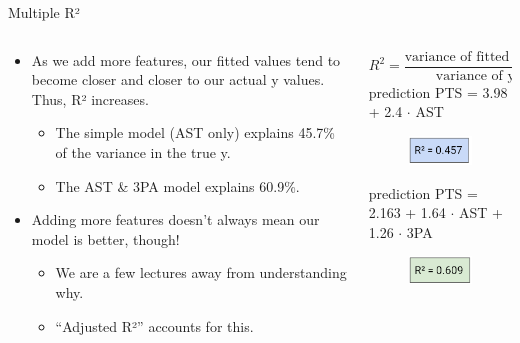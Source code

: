 \documentclass[aspectratio=169]{../latex_main/tntbeamer}  %
\begin{document}
	
	
	
	\begin{frame}{Multiple R²}
	    \begin{columns}
	        \begin{column}{.6\textwidth}
	                \begin{itemize}
	                    \item As we add more features, our fitted values tend to become closer and closer to our actual y values. Thus, R² increases.
	                    \begin{itemize}
	                        \item The simple model (AST only) explains 45.7\% of the variance in the true y.
	                        \item The AST \& 3PA model explains 60.9\%.
	                    \end{itemize}
	                    \item Adding more features doesn’t always mean our model is better, though!
	                    \begin{itemize}
	                        \item We are a few lectures away from understanding why.  
	                        \item “Adjusted R²” accounts for this.
	                    \end{itemize}
	                \end{itemize}
	        \end{column}
	            
	        \begin{column}{.4\textwidth}
	        \vspace{-1em}
	                \begin{equation*}
	                     R^2 = \frac{\text{variance of fitted values}}{\text{variance of y}}
	                 \end{equation*}
	            prediction PTS = 3.98 + 2.4 $\cdot$ AST
	            \begin{figure}
	                \includegraphics[scale=.4]{Bild14}
	            \end{figure}
	            
	            prediction PTS = 2.163 + 1.64 $\cdot$ AST + 1.26 $\cdot$ 3PA
	             \begin{figure}
	                \includegraphics[scale=.4]{Bild15}
	            \end{figure}
	        \end{column}
	    \end{columns}
	\end{frame}
\end{document}
